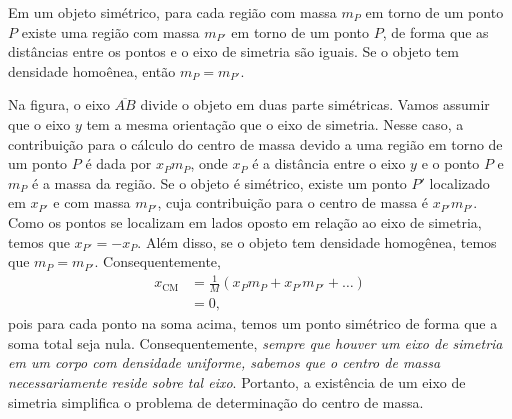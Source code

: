 \begin{marginfigure}
\centering
{}
\caption{Em um objeto simétrico, para cada região com massa $m_P$ em torno de um ponto $P$ existe uma região com massa $m_{P'}$ em torno de um ponto $P$, de forma que as distâncias entre os pontos e o eixo de simetria são iguais. Se o objeto tem densidade homoênea, então $m_P = m_{P'}$. \label{Fig:CMEixoSimetria}}
\end{marginfigure}

Na figura, o eixo $\overline{AB}$ divide o objeto em duas parte simétricas. Vamos assumir que o eixo $y$ tem a mesma orientação que o eixo de simetria. Nesse caso, a contribuição para o cálculo do centro de massa devido a uma região em torno de um ponto $P$ é dada por $x_P m_P$, onde $x_P$ é a distância entre o eixo $y$ e o ponto $P$ e $m_P$ é a massa da região. Se o objeto é simétrico, existe um ponto $P'$ localizado em $x_{P'}$ e com massa $m_{P'}$, cuja contribuição para o centro de massa é $x_{P'}m_{P'}$. Como os pontos se localizam em lados oposto em relação ao eixo de simetria, temos que $x_{P'} = - x_P$. Além disso, se o objeto tem densidade homogênea, temos que $m_P = m_{P'}$. Consequentemente,
\begin{align}
  x_\textrm{CM} &= \frac{1}{M} (x_P m_P + x_{P'} m_{P'} + \dots) \\
  &= 0,
\end{align}
%
pois para cada ponto na soma acima, temos um ponto simétrico de forma que a soma total seja nula. Consequentemente, \emph{sempre que houver um eixo de simetria em um corpo com densidade uniforme, sabemos que o centro de massa necessariamente reside sobre tal eixo}. Portanto, a existência de um eixo de simetria simplifica o problema de determinação do centro de massa.

